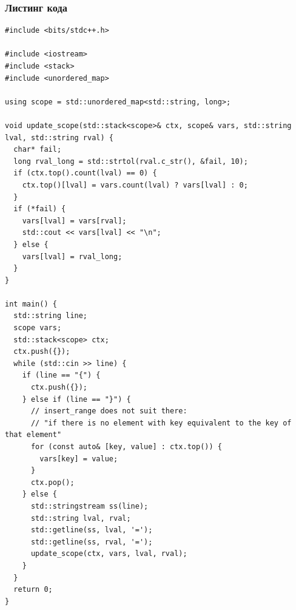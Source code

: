 \subsubsection{Листинг кода}

\begin{lstlisting}
#include <bits/stdc++.h>

#include <iostream>
#include <stack>
#include <unordered_map>

using scope = std::unordered_map<std::string, long>;

void update_scope(std::stack<scope>& ctx, scope& vars, std::string lval, std::string rval) {
  char* fail;
  long rval_long = std::strtol(rval.c_str(), &fail, 10);
  if (ctx.top().count(lval) == 0) {
    ctx.top()[lval] = vars.count(lval) ? vars[lval] : 0;
  }
  if (*fail) {
    vars[lval] = vars[rval];
    std::cout << vars[lval] << "\n";
  } else {
    vars[lval] = rval_long;
  }
}

int main() {
  std::string line;
  scope vars;
  std::stack<scope> ctx;
  ctx.push({});
  while (std::cin >> line) {
    if (line == "{") {
      ctx.push({});
    } else if (line == "}") {
      // insert_range does not suit there:
      // "if there is no element with key equivalent to the key of that element"
      for (const auto& [key, value] : ctx.top()) {
        vars[key] = value;
      }
      ctx.pop();
    } else {
      std::stringstream ss(line);
      std::string lval, rval;
      std::getline(ss, lval, '=');
      std::getline(ss, rval, '=');
      update_scope(ctx, vars, lval, rval);
    }
  }
  return 0;
}
\end{lstlisting}